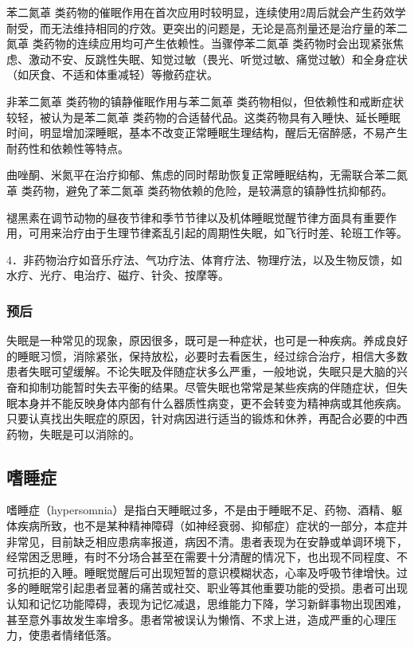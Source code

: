 苯二氮䓬
类药物的催眠作用在首次应用时较明显，连续使用2周后就会产生药效学耐受，而无法维持相同的疗效。更突出的问题是，无论是高剂量还是治疗量的苯二氮䓬
类药物的连续应用均可产生依赖性。当骤停苯二氮䓬
类药物时会出现紧张焦虑、激动不安、反跳性失眠、知觉过敏（畏光、听觉过敏、痛觉过敏）和全身症状（如厌食、不适和体重减轻）等撤药症状。

非苯二氮䓬
类药物的镇静催眠作用与苯二氮䓬
类药物相似，但依赖性和戒断症状较轻，被认为是苯二氮䓬
类药物的合适替代品。这类药物具有入睡快、延长睡眠时间，明显增加深睡眠，基本不改变正常睡眠生理结构，醒后无宿醉感，不易产生耐药性和依赖性等特点。

曲唑酮、米氮平在治疗抑郁、焦虑的同时帮助恢复正常睡眠结构，无需联合苯二氮䓬
类药物，避免了苯二氮䓬
类药物依赖的危险，是较满意的镇静性抗抑郁药。

褪黑素在调节动物的昼夜节律和季节节律以及机体睡眠觉醒节律方面具有重要作用，可用来治疗由于生理节律紊乱引起的周期性失眠，如飞行时差、轮班工作等。

4．非药物治疗如音乐疗法、气功疗法、体育疗法、物理疗法，以及生物反馈，如水疗、光疗、电治疗、磁疗、针灸、按摩等。

\subsubsection{预后}

失眠是一种常见的现象，原因很多，既可是一种症状，也可是一种疾病。养成良好的睡眠习惯，消除紧张，保持放松，必要时去看医生，经过综合治疗，相信大多数患者失眠可望缓解。不论失眠及伴随症状多么严重，一般地说，失眠只是大脑的兴奋和抑制功能暂时失去平衡的结果。尽管失眠也常常是某些疾病的伴随症状，但失眠本身并不能反映身体内部有什么器质性病变，更不会转变为精神病或其他疾病。只要认真找出失眠症的原因，针对病因进行适当的锻炼和休养，再配合必要的中西药物，失眠是可以消除的。

\subsection{嗜睡症}

嗜睡症（hypersomnia）是指白天睡眠过多，不是由于睡眠不足、药物、酒精、躯体疾病所致，也不是某种精神障碍（如神经衰弱、抑郁症）症状的一部分，本症并非常见，目前缺乏相应患病率报道，病因不清。患者表现为在安静或单调环境下，经常困乏思睡，有时不分场合甚至在需要十分清醒的情况下，也出现不同程度、不可抗拒的入睡。睡眠觉醒后可出现短暂的意识模糊状态，心率及呼吸节律增快。过多的睡眠常引起患者显著的痛苦或社交、职业等其他重要功能的受损。患者可出现认知和记忆功能障碍，表现为记忆减退，思维能力下降，学习新鲜事物出现困难，甚至意外事故发生率增多。患者常被误认为懒惰、不求上进，造成严重的心理压力，使患者情绪低落。

